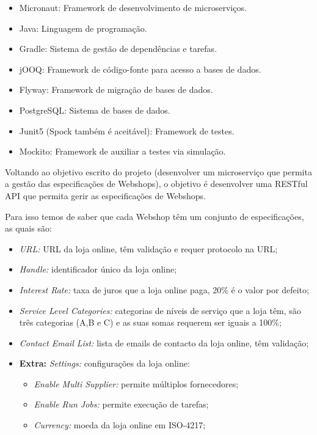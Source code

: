\begin{itemize}
  \item Micronaut: Framework de desenvolvimento de microserviços.
  \item Java: Linguagem de programação.
  \item Gradle: Sistema de gestão de dependências e tarefas.
  \item jOOQ: Framework de código-fonte para acesso a bases de dados.
  \item Flyway: Framework de migração de bases de dados.
  \item PostgreSQL: Sistema de bases de dados.
  \item Junit5 (Spock também é aceitável): Framework de testes.
  \item Mockito: Framework de auxiliar a testes via simulação.
\end{itemize}

Voltando ao objetivo escrito do projeto (desenvolver um microserviço que permita a gestão das especificações de Webshops), o objetivo é desenvolver uma RESTful API que permita gerir as especificações de Webshops.

Para isso temos de saber que cada Webshop têm um conjunto de especificações, as quais são:

\begin{itemize}
  \item \textit{URL:} URL da loja online, têm validação e requer protocolo na URL;
  \item \textit{Handle:} identificador único da loja online;
  \item \textit{Interest Rate:} taxa de juros que a loja online paga, 20\% é o valor por defeito;
  \item \textit{Service Level Categories:} categorias de níveis de serviço que a loja têm, são três categorias (A,B e C) e as suas somas requerem ser iguais a 100\%;
  \item \textit{Contact Email List:} lista de emails de contacto da loja online, têm validação;
  \item \textbf{Extra:} \textit{Settings:} configurações da loja online:
        \begin{itemize}
          \item \textit{Enable Multi Supplier:} permite múltiplos fornecedores;
          \item \textit{Enable Run Jobs:} permite execução de tarefas;
          \item \textit{Currency:} moeda da loja online em ISO-4217;
        \end{itemize}
\end{itemize}

